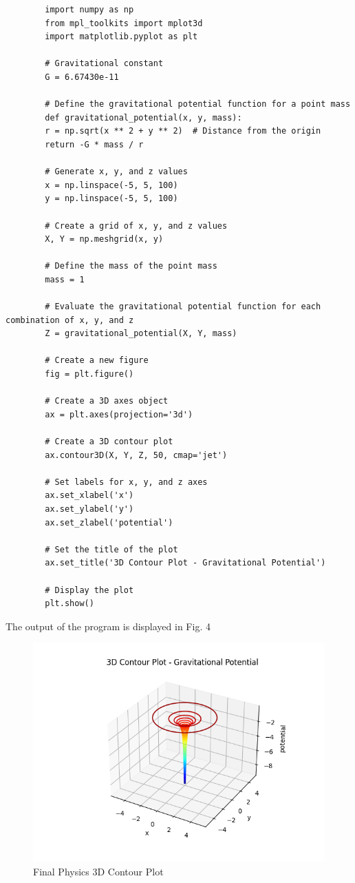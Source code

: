 \documentclass[
11pt, %
a4paper, %
oneside, %
headinclude,footinclude, %
BCOR5mm, %
]{scrartcl}
\begin{document}
\begin{enumerate}
	\begin{verbatim}
		import numpy as np
		from mpl_toolkits import mplot3d
		import matplotlib.pyplot as plt
		
		# Gravitational constant
		G = 6.67430e-11
		
		# Define the gravitational potential function for a point mass
		def gravitational_potential(x, y, mass):
		r = np.sqrt(x ** 2 + y ** 2)  # Distance from the origin
		return -G * mass / r
		
		# Generate x, y, and z values
		x = np.linspace(-5, 5, 100)
		y = np.linspace(-5, 5, 100)
		
		# Create a grid of x, y, and z values
		X, Y = np.meshgrid(x, y)
		
		# Define the mass of the point mass
		mass = 1
		
		# Evaluate the gravitational potential function for each combination of x, y, and z
		Z = gravitational_potential(X, Y, mass)
		
		# Create a new figure
		fig = plt.figure()
		
		# Create a 3D axes object
		ax = plt.axes(projection='3d')
		
		# Create a 3D contour plot
		ax.contour3D(X, Y, Z, 50, cmap='jet')
		
		# Set labels for x, y, and z axes
		ax.set_xlabel('x')
		ax.set_ylabel('y')
		ax.set_zlabel('potential')
		
		# Set the title of the plot
		ax.set_title('3D Contour Plot - Gravitational Potential')
		
		# Display the plot
		plt.show()
	\end{verbatim}
	
	The output of the program is displayed in Fig. 4
	
	\begin{figure}[H]
		\centering %
		\includegraphics[width=0.4\columnwidth]{Figures/Figure4.png} 
		\caption[Final Physics 3D Contour Plot]{Final Physics 3D Contour Plot} %
		\label{fig:gallery} 
	\end{figure}
\end{enumerate}
\end{document}
